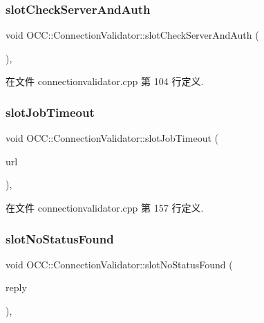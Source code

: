 \subsubsection{\texorpdfstring{slot\+Check\+Server\+And\+Auth}{slotCheckServerAndAuth}}
{\footnotesize\ttfamily void O\+C\+C\+::\+Connection\+Validator\+::slot\+Check\+Server\+And\+Auth (\begin{DoxyParamCaption}{ }\end{DoxyParamCaption})\hspace{0.3cm}{\ttfamily [protected]}, {\ttfamily [slot]}}



在文件 connectionvalidator.\+cpp 第 104 行定义.

\mbox{\label{class_o_c_c_1_1_connection_validator_a65fc93790b5f9dd642cf47dc5d3062d2}} 
\subsubsection{\texorpdfstring{slot\+Job\+Timeout}{slotJobTimeout}}
{\footnotesize\ttfamily void O\+C\+C\+::\+Connection\+Validator\+::slot\+Job\+Timeout (\begin{DoxyParamCaption}\item[{const Q\+Url \&}]{url }\end{DoxyParamCaption})\hspace{0.3cm}{\ttfamily [protected]}, {\ttfamily [slot]}}



在文件 connectionvalidator.\+cpp 第 157 行定义.

\mbox{\label{class_o_c_c_1_1_connection_validator_ae178ff61a965a319459e70e1cdadd8bb}} 
\subsubsection{\texorpdfstring{slot\+No\+Status\+Found}{slotNoStatusFound}}
{\footnotesize\ttfamily void O\+C\+C\+::\+Connection\+Validator\+::slot\+No\+Status\+Found (\begin{DoxyParamCaption}\item[{Q\+Network\+Reply $\ast$}]{reply }\end{DoxyParamCaption})\hspace{0.3cm}{\ttfamily [protected]}, {\ttfamily [slot]}}



